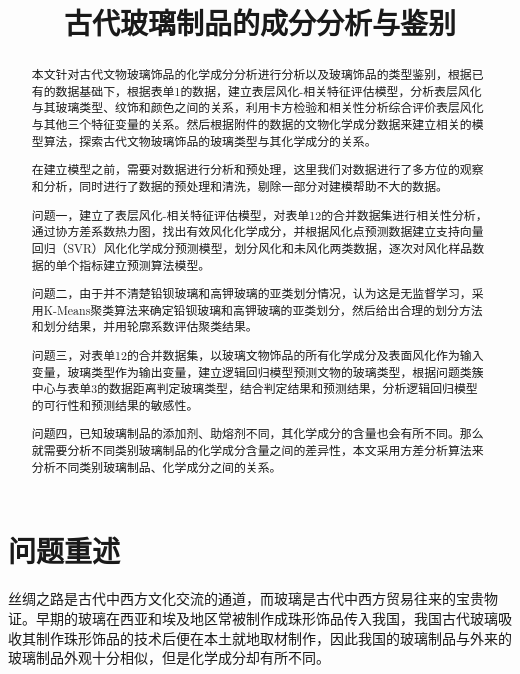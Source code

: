 \documentclass[withoutpreface,bwprint]{cumcmthesis}%
\title{古代玻璃制品的成分分析与鉴别}
\begin{document}
	
	\maketitle
	
	\begin{abstract}
		本文针对古代文物玻璃饰品的化学成分分析进行分析以及玻璃饰品的类型鉴别，根据已有的数据基础下，根据表单1的数据，建立表层风化-相关特征评估模型，分析表层风化与其玻璃类型、纹饰和颜色之间的关系，利用卡方检验和相关性分析综合评价表层风化与其他三个特征变量的关系。然后根据附件的数据的文物化学成分数据来建立相关的模型算法，探索古代文物玻璃饰品的玻璃类型与其化学成分的关系。
		
		在建立模型之前，需要对数据进行分析和预处理，这里我们对数据进行了多方位的观察和分析，同时进行了数据的预处理和清洗，剔除一部分对建模帮助不大的数据。
		
		问题一，建立了表层风化-相关特征评估模型，对表单12的合并数据集进行相关性分析，通过协方差系数热力图，找出有效风化化学成分，并根据风化点预测数据建立支持向量回归（SVR）风化化学成分预测模型，划分风化和未风化两类数据，逐次对风化样品数据的单个指标建立预测算法模型。
		
		问题二，由于并不清楚铅钡玻璃和高钾玻璃的亚类划分情况，认为这是无监督学习，采用K-Means聚类算法来确定铅钡玻璃和高钾玻璃的亚类划分，然后给出合理的划分方法和划分结果，并用轮廓系数评估聚类结果。
		
		问题三，对表单12的合并数据集，以玻璃文物饰品的所有化学成分及表面风化作为输入变量，玻璃类型作为输出变量，建立逻辑回归模型预测文物的玻璃类型，根据问题类簇中心与表单3的数据距离判定玻璃类型，结合判定结果和预测结果，分析逻辑回归模型的可行性和预测结果的敏感性。
		
		问题四，已知玻璃制品的添加剂、助熔剂不同，其化学成分的含量也会有所不同。那么就需要分析不同类别玻璃制品的化学成分含量之间的差异性，本文采用方差分析算法来分析不同类别玻璃制品、化学成分之间的关系。
	
	\end{abstract}
	
	\section{问题重述}
	丝绸之路是古代中西方文化交流的通道，而玻璃是古代中西方贸易往来的宝贵物证。早期的玻璃在西亚和埃及地区常被制作成珠形饰品传入我国，我国古代玻璃吸收其制作珠形饰品的技术后便在本土就地取材制作，因此我国的玻璃制品与外来的玻璃制品外观十分相似，但是化学成分却有所不同。
	
\end{document}
